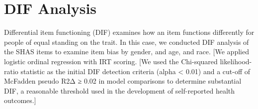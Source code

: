 \documentclass[
  letterpaper,
  DIV=11,
  numbers=noendperiod]{scrreport}
\begin{document}
\hypertarget{dif-analysis}{%
\section*{DIF Analysis}\label{dif-analysis}}

Differential item functioning (DIF) examines how an item functions
differently for people of equal standing on the trait. In this case, we
conducted DIF analysis of the SHAS items to examine item bias by gender,
and age, and race. {[}We applied logistic ordinal regression with IRT
scoring. {[}We used the Chi-squared likelihood-ratio statistic as the
initial DIF detection criteria (alpha \textless{} 0.01) and a cut-off of
McFadden pseudo R2Δ ≥ 0.02 in model comparisons to determine substantial
DIF, a reasonable threshold used in the development of self-reported
health outcomes.{]}
\end{document}

